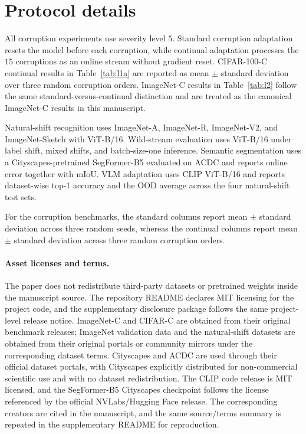 \section{Protocol details}
\label{app:protocol}

All corruption experiments use severity level $5$. Standard corruption adaptation resets the model before each corruption, while continual adaptation processes the $15$ corruptions as an online stream without gradient reset. CIFAR-100-C continual results in Table~\ref{tab:l1a} are reported as mean $\pm$ standard deviation over three random corruption orders. ImageNet-C results in Table~\ref{tab:l2} follow the same standard-versus-continual distinction and are treated as the canonical ImageNet-C results in this manuscript.

Natural-shift recognition uses ImageNet-A, ImageNet-R, ImageNet-V2, and ImageNet-Sketch with ViT-B/16. Wild-stream evaluation uses ViT-B/16 under label shift, mixed shifts, and batch-size-one inference. Semantic segmentation uses a Cityscapes-pretrained SegFormer-B5 evaluated on ACDC and reports online error together with mIoU. VLM adaptation uses CLIP ViT-B/16 and reports dataset-wise top-1 accuracy and the OOD average across the four natural-shift test sets.

For the corruption benchmarks, the standard columns report mean $\pm$ standard deviation across three random seeds, whereas the continual columns report mean $\pm$ standard deviation across three random corruption orders.

\paragraph{Asset licenses and terms.}
The paper does not redistribute third-party datasets or pretrained weights inside the manuscript source. The repository README declares MIT licensing for the project code, and the supplementary disclosure package follows the same project-level release notice. ImageNet-C and CIFAR-C are obtained from their original benchmark releases; ImageNet validation data and the natural-shift datasets are obtained from their original portals or community mirrors under the corresponding dataset terms. Cityscapes and ACDC are used through their official dataset portals, with Cityscapes explicitly distributed for non-commercial scientific use and with no dataset redistribution. The CLIP code release is MIT licensed, and the SegFormer-B5 Cityscapes checkpoint follows the license referenced by the official NVLabs/Hugging Face release. The corresponding creators are cited in the manuscript, and the same source/terms summary is repeated in the supplementary README for reproduction.

